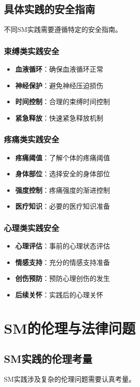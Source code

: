 \documentclass[12pt,UTF8]{ctexbook}
\begin{document}
\section{具体实践的安全指南}
不同SM实践需要遵循特定的安全指南。

\subsection{束缚类实践安全}
\begin{itemize}[leftmargin=2cm]
	\item \textbf{血液循环}：确保血液循环正常
	\item \textbf{神经保护}：避免神经压迫损伤
	\item \textbf{时间控制}：合理的束缚时间控制
	\item \textbf{紧急释放}：快速紧急释放机制
\end{itemize}

\subsection{疼痛类实践安全}
\begin{itemize}[leftmargin=2cm]
	\item \textbf{疼痛阈值}：了解个体的疼痛阈值
	\item \textbf{身体部位}：选择安全的身体部位
	\item \textbf{强度控制}：疼痛强度的渐进控制
	\item \textbf{医疗知识}：必要的医疗知识准备
\end{itemize}

\subsection{心理类实践安全}
\begin{itemize}[leftmargin=2cm]
	\item \textbf{心理评估}：事前的心理状态评估
	\item \textbf{情感支持}：充分的情感支持准备
	\item \textbf{创伤预防}：预防心理创伤的发生
	\item \textbf{后续关怀}：实践后的心理关怀
\end{itemize}

\chapter{SM的伦理与法律问题}
\section{SM实践的伦理考量}
SM实践涉及复杂的伦理问题需要认真考量。
\end{document}
